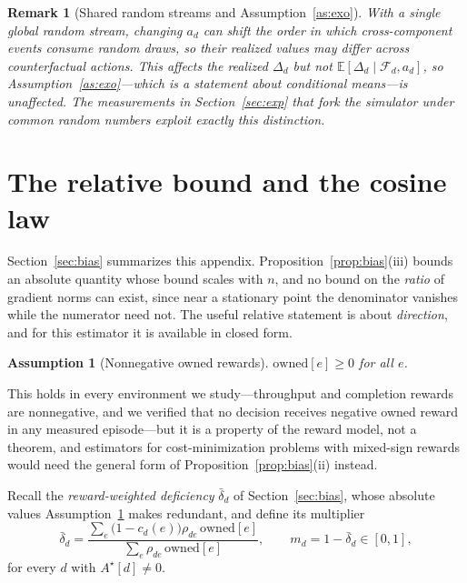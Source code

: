 \documentclass[review,authoryear,3p,times]{elsarticle}
\newtheorem{assumption}{Assumption}
\newtheorem{remark}{Remark}
\newcommand{\Fscr}{\mathcal{F}}
\newcommand{\Ex}{\mathbb{E}}
\begin{document}
\begin{remark}[Shared random streams and Assumption~\ref{as:exo}]
\label{rem:rng}
With a single global random stream, changing $a_d$ can shift the order in which
cross-component events consume random draws, so their \emph{realized} values may
differ across counterfactual actions. This affects the realized $\Delta_d$ but
not $\Ex[\Delta_d\mid\Fscr_d,a_d]$, so Assumption~\ref{as:exo}---which is a
statement about conditional means---is unaffected. The measurements in
Section~\ref{sec:exp} that fork the simulator under common random numbers
exploit exactly this distinction.
\end{remark}

\section{The relative bound and the cosine law}
\label{app:cosine}

Section~\ref{sec:bias} summarizes this appendix. Proposition~\ref{prop:bias}(iii)
bounds an absolute quantity whose bound scales with $n$, and no bound on the
\emph{ratio} of gradient norms can exist, since near a stationary point the
denominator vanishes while the numerator need not. The useful relative statement
is about \emph{direction}, and for this estimator it is available in closed
form.

\begin{assumption}[Nonnegative owned rewards]
\label{as:pos}
$\mathrm{owned}[e]\ge0$ for all $e$.
\end{assumption}

This holds in every environment we study---throughput and completion rewards
are nonnegative, and we verified that no decision receives negative owned
reward in any measured episode---but it is a property of the reward model, not a
theorem, and estimators for cost-minimization problems with mixed-sign rewards
would need the general form of Proposition~\ref{prop:bias}(ii) instead.

Recall the \emph{reward-weighted deficiency} $\bar\delta_d$ of
Section~\ref{sec:bias}, whose absolute values Assumption~\ref{as:pos} makes
redundant, and define its multiplier
\[
  \bar\delta_d=\frac{\sum_e\bigl(1-c_d(e)\bigr)\rho_{de}\,\mathrm{owned}[e]}
                    {\sum_e \rho_{de}\,\mathrm{owned}[e]},
  \qquad
  m_d = 1-\bar\delta_d \in [0,1],
\]
for every $d$ with $A^{\star}[d]\neq0$.
\end{document}
